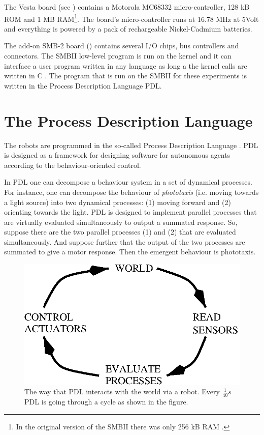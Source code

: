 The Vesta board (see ) contains a Motorola MC68332 micro-controller, 128 kB ROM and 1 MB RAM\footnote{In the original version of the SMBII there was only 256 kB RAM \citep{vereertbrugghen:1996}.}. The board's micro-controller runs at 16.78 MHz at 5Volt and everything is powered by a pack of rechargeable Nickel-Cadmium batteries.

The add-on SMB-2 board () contains several I/O chips, bus controllers and connectors. The SMBII low-level program is run on the kernel and it can interface a user program written in any language as long a the kernel calls are written in C  \citep{vereertbrugghen:1996}. The program that is run on the SMBII for these experiments is written in the Process Description Language PDL. 

\section{The Process Description Language}\label{s:robots:PDL}\label{s:robots:pdl}

The robots are programmed in the so-called Process Description Language \citep{steels:1992,steels:1994b,steels:1994a}. PDL is designed as a framework for designing software for autonomous agents according to the behaviour-oriented control. 

In PDL one can decompose a behaviour system in a set of dynamical processes. For instance, one can decompose the behaviour of {\em phototaxis} (i.e. moving towards a light source) into two dynamical processes: (1) moving forward and (2) orienting towards the light. PDL is designed to implement parallel processes that are virtually evaluated simultaneously to output a summated response. So, suppose there are the two parallel processes (1) and (2) that are evaluated  simultaneously. And suppose further that the output of the two processes are summated to give a motor response. Then the emergent behaviour is phototaxis. 

\begin{figure}
\centerline{\includegraphics[width=12cm]{robots//pdlcycle.eps}}
\caption{The way that PDL interacts with the world via a robot. Every $\frac{1}{40} s$ PDL is going through a cycle as shown in the figure.}
\label{f:pdlcycle}
\end{figure}

